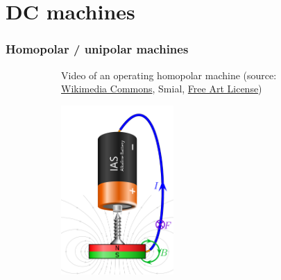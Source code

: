 \section{DC machines}


\begin{frame}
	\frametitle{Homopolar / unipolar machines}
    \vspace{-0.3cm}
	\begin{figure}
		\centering
		\begin{subfigure}[b]{0.49\textwidth}
			\centering
            \vspace{0.75cm}
			\caption{Video of an operating homopolar machine (source: \href{https://de.wikipedia.org/wiki/Datei:Homopolarmotor_MAQ03891_smial_wp.ogv}{Wikimedia Commons}, Smial, \href{https://artlibre.org/licence/lal/en/}{Free Art License})}
		\end{subfigure}
		\hfill
		\begin{subfigure}[b]{0.49\textwidth}
			\centering
			\includegraphics[width=0.47\textwidth]{fig/lec03/Homopolar_machine.pdf}

\end{subfigure}
\end{figure}
\end{frame}
